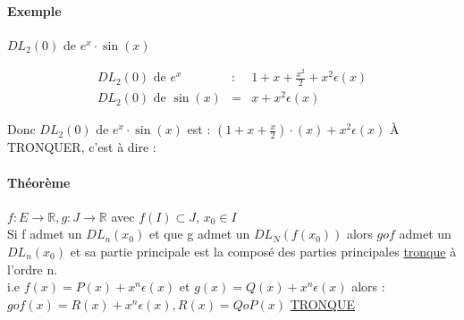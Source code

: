 	\paragraph{Exemple} $DL_2(0)$ de $e^x \cdot \sin(x)$ 

	\[\begin{array}{rcl}
			DL_2(0) \text{ de } e^x &:& 1+x+\frac{x^2}{2} + x^2 \epsilon (x) \\
			DL_2(0) \text{ de } \sin(x) &=& x + x^2\epsilon(x)
	\end{array}\]

	Donc $DL_2(0)$ de $e^x \cdot \sin(x)$ est : $(1+x+\frac{x}{2})\cdot(x) + x^2\epsilon(x)$ À TRONQUER, c'est à dire : ~\\

	\paragraph{Théorème} $f:E \rightarrow \mathbb{R}, g : J \rightarrow \mathbb{R}$ avec $f(I) \subset J$, $x_0 \in I$ ~\\
	Si f admet un $DL_n(x_0)$ et que g admet un $DL_N(f(x_0))$ alors $gof$ admet un $DL_n(x_0)$ et sa partie principale est la composé des parties principales \ul{tronque} à l'ordre n. ~\\
	i.e $f(x)=P(x) + x^n \epsilon(x)$ et $g(x) = Q(x) + x^n\epsilon(x)$ alors : ~\\
	$gof(x) = R(x)+x^n \epsilon(x), R(x) = QoP(x)$ \ul{TRONQUE}
